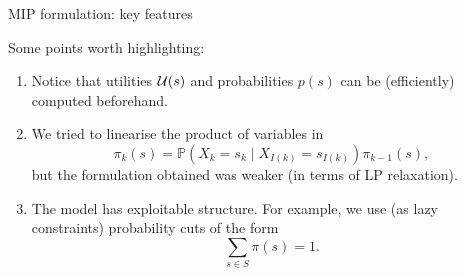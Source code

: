 \documentclass[mathserif,aspectratio=149]{beamer}
\begin{document}
\begin{frame}{MIP formulation: key features}

Some points worth highlighting:
\begin{enumerate}[<+->]
\item Notice that utilities ${\cal U}(s)$ and probabilities $p(s)$ can be (efficiently) computed \alert{beforehand}.
\item We tried to linearise the product of variables in  
$$\pi_k(s) = \mathbb{P}\left(X_k = s_k \mid X_{I(k)} = s_{I(k)}\right) \pi_{k-1}(s), $$
but the formulation obtained was weaker (in terms of LP relaxation).
\item The model has \alert{exploitable structure}. For example, we use (as lazy constraints) \alert{probability cuts} of the form
$$\sum_{s\in S} \pi(s) = 1.$$
\end{enumerate}

\end{frame}
\end{document}
